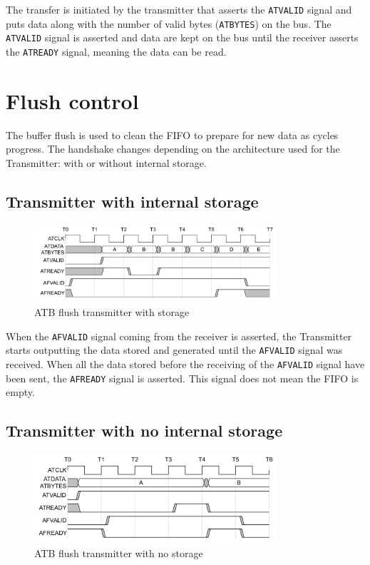 The transfer is initiated by the transmitter that asserts the \texttt{ATVALID} signal and puts 
data along with the number of valid bytes (\texttt{ATBYTES}) on the bus. The \texttt{ATVALID} 
signal is asserted and data are kept on the bus until the receiver asserts the \texttt{ATREADY} 
signal, meaning the data can be read.

\section{Flush control}
The buffer flush is used to clean the FIFO to prepare for new data as cycles progress.
The handshake changes depending on the architecture used for the Transmitter: with or without 
internal storage.

\subsection{Transmitter with internal storage}
\begin{figure}[H]
    \centering
    \includegraphics[width=0.8\textwidth]{img/atb_flush_store.png}
    \caption{ATB flush transmitter with storage}
    \label{fig:atb_flush_store}
\end{figure}

When the \texttt{AFVALID} signal coming from the receiver is asserted, the Transmitter starts 
outputting the data stored and generated until the \texttt{AFVALID} signal was received.
When all the data stored before the receiving of the \texttt{AFVALID} signal have been sent, 
the \texttt{AFREADY} signal is asserted. This signal does not mean the FIFO is empty.

\subsection{Transmitter with no internal storage}

\begin{figure}[H]
    \centering
    \includegraphics[width=0.8\textwidth]{img/atb_flush_no_store.png}
    \caption{ATB flush transmitter with no storage}
    \label{fig:atb_flush_no_store}
\end{figure}

